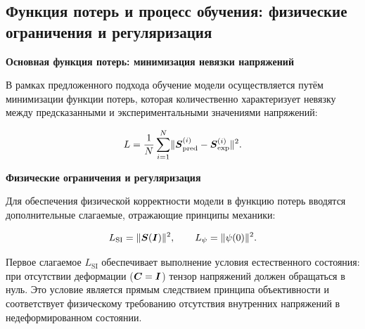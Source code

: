 


\subsection{Функция потерь и процесс обучения: физические ограничения и регуляризация}

\textbf{Основная функция потерь: минимизация невязки напряжений}

В рамках предложенного подхода обучение модели осуществляется путём минимизации функции потерь, 
которая количественно характеризует невязку между предсказанными и экспериментальными значениями напряжений:

\begin{equation}
 L = \frac{1}{N}\sum_{i=1}^N \lVert \boldsymbol{S}^{(i)}_{\text{pred}} - \boldsymbol{S}^{(i)}_{\text{exp}} \rVert^2.
\label{eq:main_loss_function}
\end{equation}


\textbf{Физические ограничения и регуляризация}

Для обеспечения физической корректности модели в функцию потерь вводятся дополнительные слагаемые, 
отражающие принципы механики:

\begin{equation}
 L_{\text{SI}} = \lVert \boldsymbol{S}(\boldsymbol{I})\rVert^2,\qquad L_{\psi}=\lVert\psi(0)\rVert^2.
\label{eq:physical_constraints}
\end{equation}

Первое слагаемое $L_{\text{SI}}$ обеспечивает выполнение условия естественного состояния: 
при отсутствии деформации ($\boldsymbol{C} = \boldsymbol{I}$) тензор напряжений должен обращаться в нуль. 
Это условие является прямым следствием принципа объективности и соответствует физическому требованию 
отсутствия внутренних напряжений в недеформированном состоянии.

